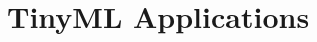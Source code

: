 \documentclass[../main]{subfiles}
\begin{document}
\chapter{TinyML Applications} \label{chp:}




\end{document}
